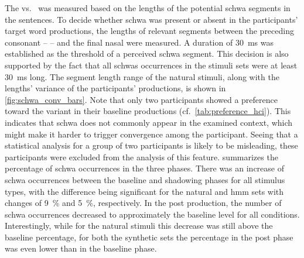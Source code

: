 The \textipa{[\s{n}]} vs.\ \textipa{[@n]} was measured based on the lengths of the potential schwa segments in the sentences.
To decide whether schwa was present or absent in the participants' target word productions, the lengths of relevant segments between the preceding consonant --  -- and the final nasal were measured.
A duration of \SI{30}{\milli\second} was established as the threshold of a perceived schwa segment.
This decision is also supported by the fact that all schwas occurrences in the stimuli sets were at least \SI{30}{\milli\second} long.
The segment length range of the natural stimuli, along with the lengths' variance of the participants' productions, is shown in \cref{fig:schwa_conv_bars}.
Note that only two participants showed a preference toward the \textipa{[@n]} variant in their baseline productions (cf.\ \cref{tab:preference_hci}).
This indicates that schwa does not commonly appear in the examined context, which might make it harder to trigger convergence among the participant.
Seeing that a statistical analysis for a group of two participants is likely to be misleading, these participants were excluded from the analysis of this feature.
 summarizes the percentage of schwa occurrences in the three phases.
There was an increase of schwa occurrences between the baseline and shadowing phases for all stimulus types, with the difference being significant for the natural and \ac{hmm} sets with changes of \SI{9}{\percent} and \SI{5}{\percent}, respectively.
In the post production, the number of schwa occurrences decreased to approximately the baseline level for all conditions.
Interestingly, while for the natural stimuli this decrease was still above the baseline percentage, for both the synthetic sets the percentage in the post phase was even lower than in the baseline phase.
%

